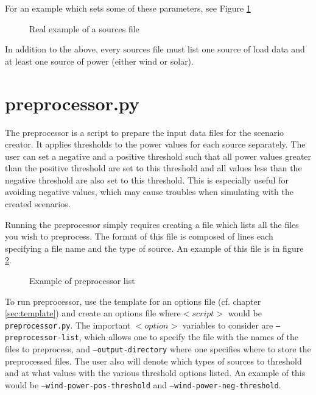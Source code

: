 \documentclass[11pt]{article}
\begin{document}
For an example which sets some of these parameters, see Figure \ref{fig:sources2}
\begin{figure}[H]
	\begin{framed}
		
	\end{framed}
	\caption{Real example of a sources file}
	\label{fig:sources2}
\end{figure}

In addition to the above, every sources file must list one source of load data and at least one source of power (either wind or solar).

\section{preprocessor.py}\label{sec:preprocessor}

The preprocessor is a script to prepare the input data files for the scenario creator. It applies thresholds to the power values for each source separately. The user can set a negative and a positive threshold such that all power values greater than the positive threshold are set to this threshold and all values less than the negative threshold are also set to this threshold. This is especially useful for avoiding negative values, which may cause troubles when simulating with the created scenarios.

Running the preprocessor simply requires creating a file which lists all the files you wish to preprocess. 
The format of this file is composed of lines each specifying a file name and the type of source.
An example of this file is in figure \ref{fig:list_of_files.txt}.

\begin{figure}[H]
	\begin{framed}
		
	\end{framed}
	\caption{Example of preprocessor list}
	\label{fig:list_of_files.txt}
\end{figure}

To run preprocessor, use the template for an options file (cf. chapter \ref{sec:template})  and create an options file where$<script>$ would be \texttt{preprocessor.py}. The important $<option>$ variables to consider are \texttt{--preprocessor-list}, which allows one to specify the file with the names of the files to preprocess, and \texttt{--output-directory} where one specifies where to store the preprocessed files. The user also will denote which types of sources to threshold and at what values with the various threshold options listed. An example of this would be \texttt{--wind-power-pos-threshold} and  \texttt{--wind-power-neg-threshold}.
\end{document}
